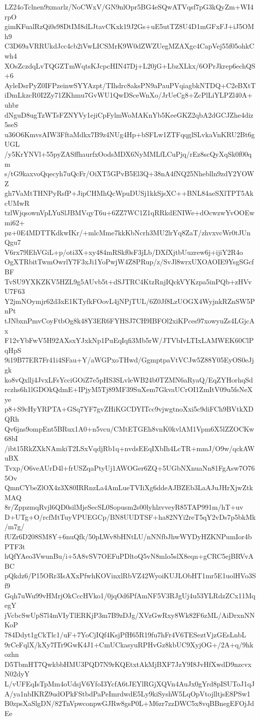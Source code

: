LZ24oTclnen9xmarlz/NoCWxV/GN9nlOpr5BG4eSQwATVqsf7pG3kQyZm+WI4rpO
gimKFualRzQi0s98DtIM8dLJtavCKxk19J2Gs+uE5utTZ8U4D1mGFxFJ+iJ5OMh9
C3D69aVRRUkdJcc4cb2iVwLICSMrK9W0dZWZUegMZAXgc4CapVej55f05ohkCwh4
XOsZczdqLvTQGZTmWqtsKJcpcHIN47Dj+L20jG+LbzXLkx/6OPrJkrep6echQS+6
AyleDsrPyZ0IFPzeinwSYYAzpt/TIhdrc8aksPN9aPauPVqiagbkNTDQ+C2eBXtT
iDmLkzcR0I2Zy71ZKhmu7GvWU1QwDSceWnXo/JrUeCg8+ZcPlLiYLPZl40A+uhbr
dNguD8ugTzWTsFZNYVy1ejiCpFylmWoMAKnYb5KeeGKZ2qbA2dGCJZhe4diz5seS
u36O6KmvsAIW3FftaMdkx7B9z4NUg4Hp+bSFLw1ZTFqqglSLvkaVnKRU2Bt6gUGL
/y5KrYNVl+55pyZASffhaurfxOodsMDX6NyMMLfLCuPjq/rEz8scQyXqSk0f00qm
s/tG9kaxvoQqecyh7uQcFr/OiXT5GPvB5El3Q+38nA4fNQ25Nheblln9zdY2YOWZ
gh7VaMtTHNPyRsfP+JipCHMhQcWpuDUSj1kkSjsXC++BNL84aeSXlTPT5AkcUMwR
tzlWjqsownVpLYuSlJBMVqyT6u+6ZZ7WC1Z1qRRkdENIWe+dOcwzwYvOOEwmi62+
pz+0E4MDTTKdkwIKr/+mlcMme7kkKbNcrh3MU2lrYq8ZaT/zhvxvcWr0tJUnQgu7
V6rx79lEhVGiL+p/oti3X+xy484mRSkf0sF3jLb/DXfXjtbUuzrew6j+ijiY2R4o
OgXTRbitTwmOwrlY7F3xJi1YoPwjW4Z8PRup/z/SvJl8wrxUXOAOIE9YsgSGcfBF
TvSU9YXKZKV5HZL9g5AUvb5t+dSJTRC4KtzRnjIQckVYKzpa5inPQb+zHVvU7F63
Y2jmNOymjr62d3xE1KTyfkFOovL4jNPjTUL/6Z0Jf8LzUOGX4WyjnkRZnSW5PnPt
tJNbxnPmvCoyFtbOg8k48Y3ER6FYHSJ7CH9IBFOl2xiKPces97xowyuZs4LGjcAx
F12vYbFwV5H92AXsxYJxkNp1PuEqIqfi3Mb5rW/JTVbIvLTIxLAMWEK60ClPqHpS
9i19B77ER7Fr41i4SFau+Y/aWGPxoTHwd/GgmptpaVtVCJw5Z88Y05EyOS0eJjgk
ko8vQxllj4JvxLFsYcciGOiZ7e5pHS3SLvleWB24b0TZMN6aRyaQ/EqZYHorhqSd
rczhs6h1lGDOkQdmE+IPjyM5Tj89MF39SuXem7GkvaUCrOI1ZmItV09u5fsNeXye
p8+S9cHyYRPTA+GSq7YF7gvZHiKGCDYITcc9vjwgtnoXxi5c9diFCh9BVtkXDQRh
Qv6jns9ompEnt5BRux1A0+n5vcu/CMtETGEh8vnK0kvlAM1Vpm6X5lZZOCKw68bI
/ibt15RkZXkNAmkiT2LSxVqdjRb1q+nvdsEEqIXbIh4LcTR+mmJ/O9w/qckAWuBX
Tvxp/O6veAUrD4l+frUSZqaPtyUj1AWOGer6ZQ+5UGbNXnuaNn81FgAsw7O765Ov
QmnCYbeZlOX4z3X80IRRnzLa4AmLueTVIiXg6ddeAJBZEb3LaAJuJHrXjwZtkMAQ
8r/ZppzmqRvjl6QD0silMjeSecSL0Sopusm2s00lyhlzvveyR85TAP991m/hT+uv
D+UTg+O/rcfMtTuyVPUEGCp/BN8UUDTSF+ha82NYi2reT5qY2vDs7p5bkMk/m7g/
fUZr6D208SM8Y+6nuQfk/50pLWv8bHNtLU/nNNfbJhwWYDyHZKNPumIor4bPTF3t
hQfYAeo3VwunBu/i+5A8vSV7OEFuPDltoQ5vN8mlo5slX8eqn+gCRC5ejBRVvABC
pQkdz6/P15ORr3IsAXxPfwhKOVinxlRbVZ42WyoiKUJLObHT1mr5E1uolHVo3Sf9
Gqh7uWu99vHMrjOkCccHVko1/0jqOd6PfAmNF5V3RJgUj4u53YLRdzZCx11MqegY
jVcbcSwUpS7l4mVIyTlERKjP3m7B9zDJg/XVzGwRxy8Wk82F6zML/AiDrxnNNKoP
784Ddyt1gCkTlc1/uF+7YoCjIQf4KsjPfH65R19fu7hFr4V6TESeztVjzGEsLnbL
9rCeFqlX/kXy7ITr9GwK4J1+CmUCkasyuRPHvGz8kbUC9XyjOG+/2A+q/9hkozhn
D5TbmHT7QwkbbHMU3PQD7N9rKQEtxtAkMjBXF7JzY9I8JvHfXwdD9nzcvxN02dyY
L/vUFEqIsTpMm4oUdsjV6YfoI3YcfA6tJEYlRGjXQVn4AuJx0gYrd8pISUToJ1qJ
A/ya1nbIKRZ9udOPkFStbdPaPeImrdwdE5Ly9kiSyshW5LqOpVtojlltjsE8PSw1
B0zpsXaSlgDN/82TnVpwconpwGJRw8gsP0L+M6zr7zzDWC5x8vqBBnegEFOjJdEe
